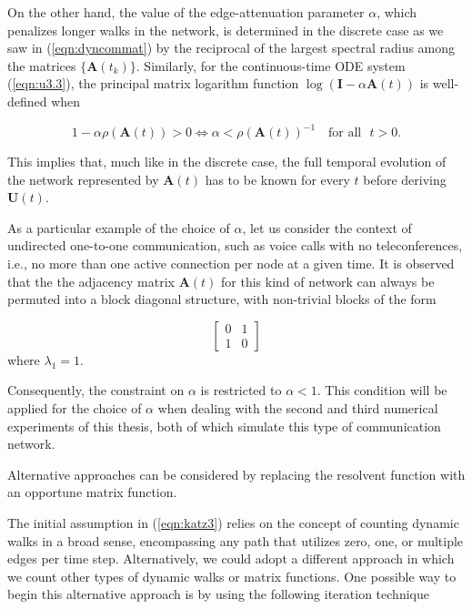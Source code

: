On the other hand, the value of the edge-attenuation parameter $\alpha$, which penalizes longer walks in the network, is determined in the discrete case as we saw in (\ref{eqn:dyncommat}) by the reciprocal of the largest spectral radius among the matrices $\{\mathbf{A}(t_k)\}$. Similarly, for the continuous-time ODE system (\ref{eqn:u3.3}), the principal matrix logarithm function $\log (\mathbf{I} - \alpha \mathbf{A}(t))$ is well-defined when \cite[Ch.\ 11]{higham2008functions} 

$$1 - \alpha\rho(\mathbf{A}(t)) > 0 \iff \alpha < \rho(\mathbf{A}(t))^{-1} \text{~~~for all~~} t>0.$$

This implies that, much like in the discrete case, the full temporal evolution of the network represented by $\mathbf{A}(t)$ has to be known for every $t$ before deriving $\mathbf{U}(t)$.

As a particular example of the choice of $\alpha$, let us consider the context of undirected one-to-one communication, such as voice calls with no teleconferences, i.e., no more than one active connection per node at a given time. It is observed that the the adjacency matrix $\mathbf{A}(t)$ for this kind of network can always be permuted into a block diagonal structure, with non-trivial blocks of the form

$$\begin{bmatrix}
0 & 1\\
1 & 0 
\end{bmatrix}$$ where $\lambda_1=1$.

Consequently, the constraint on $\alpha$ is restricted to $\alpha<1$. This condition will be applied for the choice of $\alpha$ when dealing with the second and third numerical experiments of this thesis, both of which simulate this type of communication network.

\begin{highlightedParagraphC}

Alternative approaches can be considered by replacing the resolvent function with an opportune matrix function.
 

\end{highlightedParagraphC}

The initial assumption in (\ref{eqn:katz3}) relies on the concept of counting dynamic walks in a broad sense, encompassing any path that utilizes zero, one, or multiple edges per time step. Alternatively, we could adopt a different approach in which we count other types of dynamic walks or matrix functions. One possible way to begin this alternative approach is by using the following iteration technique

